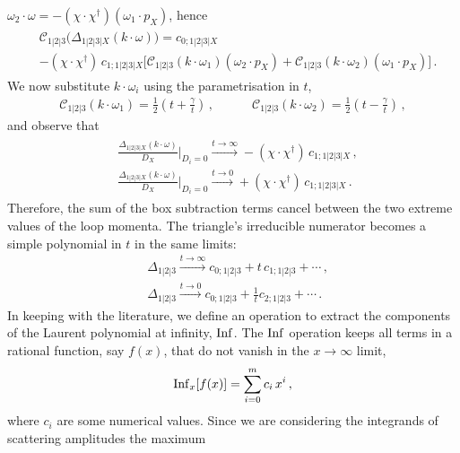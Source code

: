 $\omega_2\cdot\omega = - (\chi\cdot\chi^\dagger) (\omega_1\cdot p_X)$, hence
\begin{align}
\begin{aligned}
&\mathcal{C}_{1|2|3}\bigl(\Delta_{1|2|3|X}(k\cdot\omega)\bigr) =
  c_{0;1|2|3|X} \\
  &- (\chi\cdot\chi^\dagger) \, c_{1;1|2|3|X}\bigl[ \mathcal{C}_{1|2|3}(k\cdot\omega_1) (\omega_2\cdot p_X) + \mathcal{C}_{1|2|3}(k\cdot\omega_2) (\omega_1\cdot p_X) \bigr] \,.
\end{aligned}
\end{align}
We now substitute $k\cdot\omega_i$ using the parametrisation in $t$,
\begin{align} 
  \mathcal{C}_{1|2|3}(k\cdot\omega_1) = \frac{1}{2}\left( t + \frac{\gamma}{t} \right) \,, \quad \qquad
  \mathcal{C}_{1|2|3}(k\cdot\omega_2) = \frac{1}{2}\left( t - \frac{\gamma}{t} \right) \,,
\end{align}
and observe that
\begin{align} \label{eq:tlim_boxnum}
\begin{aligned}
  &\frac{\Delta_{1|2|3|X}(k\cdot\omega)}{D_X} \bigg|_{D_i=0} \overset{t\to \infty}{\to} - (\chi\cdot\chi^\dagger) \, c_{1;1|2|3|X} \,, \\
  &\frac{\Delta_{1|2|3|X}(k\cdot\omega)}{D_X} \bigg|_{D_i=0} \overset{t\to 0}{\to} + (\chi\cdot\chi^\dagger) \, c_{1;1|2|3|X} \,.
\end{aligned}
\end{align}
Therefore, the sum of the box subtraction terms cancel between the two extreme
values of the loop momenta. The triangle's irreducible numerator becomes a
simple polynomial in $t$ in the same limits:
\begin{align}
  &\Delta_{1|2|3} \overset{t\to \infty}{\to} c_{0;1|2|3} + t \, c_{1;1|2|3} + \cdots \,, \\
  &\Delta_{1|2|3} \overset{t\to 0}{\to} c_{0;1|2|3} + \frac{1}{t} c_{2;1|2|3} + \cdots \,.
\end{align}
In keeping with the literature, we define an operation to extract the
components of the Laurent polynomial at infinity, ${\rm Inf}$. The ${\rm Inf}$
operation keeps all terms in a rational function, say $f(x)$, that  do not vanish in the $x \to \infty$
limit,
\begin{equation} \label{eq:InfDef}
  {\rm Inf}_x[f(x)] = \sum_{i=0}^m c_i \, x^i \,,
\end{equation}
where $c_i$ are some numerical values. Since we are considering the integrands of scattering amplitudes the maximum
